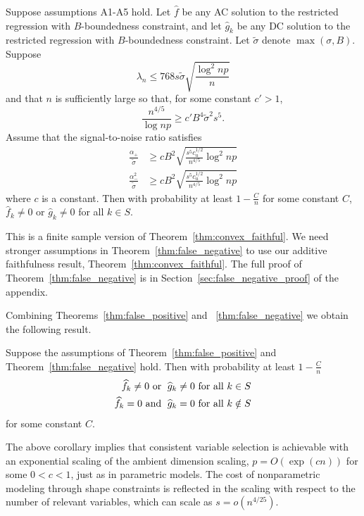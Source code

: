 \begin{theorem}
\label{thm:false_negative}
Suppose assumptions A1-A5 hold. Let $\hat{f}$ be any AC solution to
the restricted regression with $B$-boundedness constraint, and let
$\hat{g}_k$ be any DC solution to the restricted regression with
$B$-boundedness constraint. Let $\tilde{\sigma}$ denote $\max(\sigma,
B)$.  Suppose 
\begin{equation}
\lambda_n \leq  768 s \tilde{\sigma} \sqrt{\frac{\log^2 np}{n}}
\end{equation}
and that $n$ is sufficiently large so that, for some constant $c' > 1$,
\begin{equation}
\frac{n^{4/5}}{\log np} \geq c' B^4 \tilde{\sigma}^2 s^5.
\end{equation}
Assume that the signal-to-noise ratio satisfies
\begin{align}
\frac{\alpha_{+}}{\tilde{\sigma}} & \geq c B^2
\sqrt{\frac{s^5 c_u^{1/2}}{n^{4/5}} \log^2 np}\\
\frac{\alpha_{-}^2}{\tilde{\sigma}} &\geq c B^2
\sqrt{\frac{s^5 c_u^{1/2}}{n^{4/5}} \log^2 np}
\end{align}
where $c$ is a constant.  Then with probability at least $1 -
\frac{C}{n}$ for some constant $C$, 
$\hat{f}_k \neq 0$ or $\hat{g}_k \neq 0$ 
for all $k \in S$.
\end{theorem}

This is a finite sample version of
Theorem~\ref{thm:convex_faithful}. We need stronger assumptions in
Theorem~\ref{thm:false_negative} to use our additive faithfulness
result, Theorem~\ref{thm:convex_faithful}. The full proof of Theorem~\ref{thm:false_negative} is in Section~\ref{sec:false_negative_proof} of the appendix.

Combining Theorems~\ref{thm:false_positive} and
~\ref{thm:false_negative} 
we obtain the following result.
\begin{corollary}
  Suppose the assumptions of Theorem~\ref{thm:false_positive} and
  Theorem~\ref{thm:false_negative} hold.  
Then with probability at least $1-\frac{C}{n}$
\begin{align}
\widehat{f}_k \neq 0 \textrm{ or }\; \widehat{g}_k \neq 0 &\textrm{ for all } k \in S\\
\widehat{f}_k = 0 \textrm{ and }\; \widehat{g}_k = 0 & \textrm{ for all } k \notin S
\end{align}
for some constant $C$.

\end{corollary}
The above corollary implies that consistent variable selection is
achievable with an exponential scaling of the ambient dimension
scaling, $p = O(\exp(cn))$ for some $0<c<1$, just as in parametric models.
The cost of nonparametric modeling through shape constraints is
reflected in the scaling with respect to the number of relevant
variables, which can scale as $s = o(n^{4/25})$.

